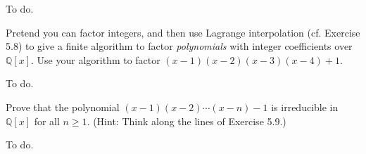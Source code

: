 \documentclass[../../master.tex]{subfiles}
\begin{document}
\begin{solution}
    To do.
\end{solution}

\begin{problem}
    Pretend you can factor integers, and then use Lagrange interpolation (cf. Exercise 5.8) to give a finite algorithm to factor \textit{polynomials} with integer coefficients over $\mathbb{Q}[x]$.
    Use your algorithm to factor $(x-1)(x-2)(x-3)(x-4)+1$.
\end{problem}

\begin{solution}
    To do.
\end{solution}

\begin{problem}
    Prove that the polynomial $(x-1)(x-2)\cdots(x-n) - 1$ is irreducible in $\mathbb{Q}[x]$ for all $n \geq 1$. 
    (Hint: Think along the lines of Exercise 5.9.)
\end{problem}

\begin{solution}
    To do.
\end{solution}
\end{document}
